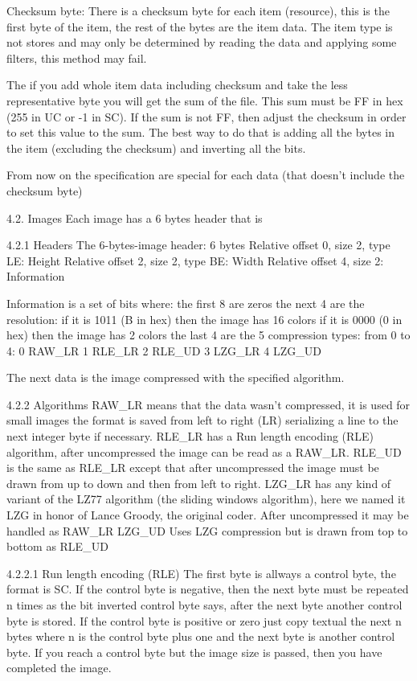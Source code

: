  Checksum byte:
 There is a checksum byte for each item (resource), this is the first byte
 of the item, the rest of the bytes are the item data. The item type is not
 stores and may only be determined by reading the data and applying some
 filters, this method may fail.

 The if you add whole item data including checksum and take the less
 representative byte you will get the sum of the file. This sum must be FF
 in hex (255 in UC or -1 in SC). If the sum is not FF, then adjust the
 checksum in order to set this value to the sum. The best way to do that is
 adding all the bytes in the item (excluding the checksum) and inverting
 all the bits.

 From now on the specification are special for each data (that doesn't
 include the checksum byte)

4.2. Images
 Each image has a 6 bytes header that is

4.2.1 Headers
 The 6-bytes-image header: 6 bytes
  Relative offset 0, size 2, type LE: Height
  Relative offset 2, size 2, type BE: Width 
  Relative offset 4, size 2: Information

 Information is a set of bits where:
  the first 8 are zeros
  the next 4 are the resolution:
   if it is 1011 (B in hex) then the image has 16 colors
   if it is 0000 (0 in hex) then the image has 2 colors
  the last 4 are the 5 compression types:
   from 0 to 4:
   0 RAW_LR
   1 RLE_LR
   2 RLE_UD
   3 LZG_LR
   4 LZG_UD

 The next data is the image compressed with the specified algorithm.

4.2.2 Algorithms
 RAW_LR means that the data wasn't compressed, it is used for small images
        the format is saved from left to right (LR) serializing a line to
        the next integer byte if necessary.
 RLE_LR has a Run length encoding (RLE) algorithm, after uncompressed the
        image can be read as a RAW_LR.
 RLE_UD is the same as RLE_LR except that after uncompressed the image must
        be drawn from up to down and then from left to right.
 LZG_LR has any kind of variant of the LZ77 algorithm (the sliding windows
        algorithm), here we named it LZG in honor of Lance Groody, the
        original coder.
        After uncompressed it may be handled as RAW_LR
 LZG_UD Uses LZG compression but is drawn from top to bottom as RLE_UD

4.2.2.1 Run length encoding (RLE)
 The first byte is allways a control byte, the format is SC. If the control
 byte is negative, then the next byte must be repeated n times as the bit
 inverted control byte says, after the next byte another control byte is
 stored.
 If the control byte is positive or zero just copy textual the next n bytes
 where n is the control byte plus one and the next byte is another control
 byte.
 If you reach a control byte but the image size is passed, then you have
 completed the image.

